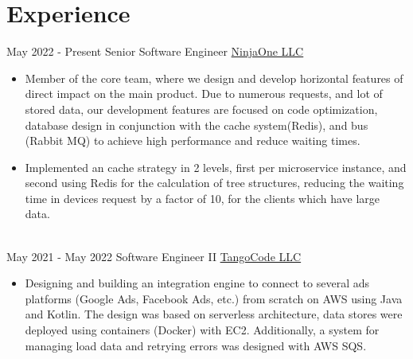 \documentclass[letterpaper]{twentysecondcv} %
\begin{document}

\section{Experience}

\begin{twenty} %

\twentyitem
    {May 2022 -}
    {Present}
    {Senior Software Engineer}
    {\href{https://www.ninjaone.com/about-us/}{NinjaOne LLC}}
    {}
    {
        \begin{itemize}
            \item
            Member of the core team, where we design and develop horizontal features of direct impact on the main product. Due to numerous requests, and lot of stored data, our development features are focused on code optimization, database design in conjunction with the cache system(Redis), and bus (Rabbit MQ) to achieve high performance and reduce waiting times.
         \end{itemize}
         
        \begin{itemize}
            \item
            Implemented an cache strategy in 2 levels, first per microservice instance, and second using Redis for the calculation of tree structures, reducing the waiting time in devices request by a factor of 10, for the clients which have large data.
         \end{itemize}
         
    }
    
    \\
    
\twentyitem
    {May 2021 -}
    {May 2022}
    {Software Engineer II}
    {\href{https://tangocode.com/}{TangoCode LLC}}
    {}
    {
    
        \begin{itemize}
            \item Designing and building an integration engine to connect to several ads platforms (Google Ads, Facebook Ads, etc.) from scratch on AWS using Java and Kotlin. The design was based on serverless architecture, data stores were deployed using containers (Docker) with EC2. Additionally, a system for managing load data and retrying errors was designed with AWS SQS.
         \end{itemize}
         
}
\end{twenty}
\end{document}
